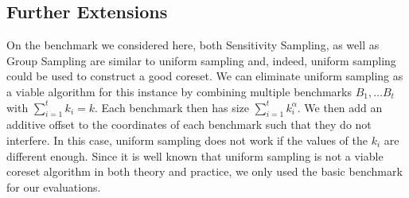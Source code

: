 \subsection{Further Extensions}

On the benchmark we considered here, both Sensitivity Sampling, as well as Group Sampling are similar to uniform sampling and, indeed, uniform sampling could be used to construct a good coreset. We can eliminate uniform sampling as a viable algorithm for this instance by combining multiple benchmarks $B_1,\ldots B_t$ with $\sum_{i=1}^t  k_i =k$. Each benchmark then has size $\sum_{i=1}^t  k_i^{\alpha}$. We then add an additive offset to the coordinates of each benchmark such that they do not interfere. In this case, uniform sampling does not work if the values of the $k_i$ are different enough. Since it is well known that uniform sampling is not a viable coreset algorithm in both theory and practice, we only used the basic benchmark for our evaluations.


